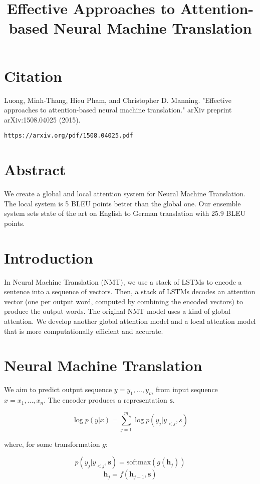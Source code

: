 \documentclass[a4paper]{article}
\title{Effective Approaches to Attention-based Neural Machine Translation}
\date{}
\begin{document}
\maketitle

\section{Citation}
Luong, Minh-Thang, Hieu Pham, and Christopher D. Manning. "Effective approaches to attention-based neural machine translation." arXiv preprint arXiv:1508.04025 (2015).

\begin{verbatim}
https://arxiv.org/pdf/1508.04025.pdf
\end{verbatim}

\section{Abstract}
We create a global and local attention system for Neural Machine Translation.
The local system is 5 BLEU points better than the global one. Our ensemble
system sets state of the art on English to German translation with 25.9 BLEU
points.

\section{Introduction}
In Neural Machine Translation (NMT), we use a stack of LSTMs to encode
a sentence into a sequence of vectors. Then, a stack of LSTMs decodes an
attention vector (one per output word, computed by combining the encoded
vectors) to produce the output words. The original NMT model uses a kind
of global attention. We develop another global attention model and a local
attention model that is more computationally efficient and accurate.

\section{Neural Machine Translation}
We aim to predict output sequence $y = y_1, ..., y_m$ from input sequence
$x = x_1, ..., x_n$. The encoder produces a representation $\mathbf{s}$.

$$
\log{p(y|x)} = \sum_{j=1}^{m}{\log{p(y_j | y_{<j}, s)}}
$$

where, for some transformation $g$:

$$
p(y_j | y_{<j}, \mathbf{s}) = \text{softmax}(g(\mathbf{h}_j))
$$
$$
\mathbf{h}_j = f(\mathbf{h}_{j-1}, \mathbf{s})
$$
\end{document}
